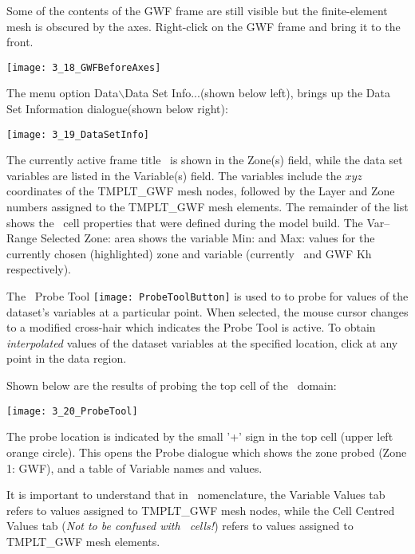 Some of the contents of the {\sf GWF} frame are still visible but the finite-element mesh is obscured by the axes.  Right-click on the {\sf GWF} frame and bring it to the front.

        \texttt{[image: 3\_18\_GWFBeforeAxes]}

  The menu option {\sf Data$\backslash$Data Set Info...}(shown below left), brings up the {\sf Data Set Information} dialogue(shown below right):

        \texttt{[image: 3\_19\_DataSetInfo]}

The currently active frame title \gwf\ is shown in the {\sf Zone(s)} field, while the data set variables are listed in the {\sf Variable(s)} field. The variables include the $xyz$ coordinates of the {\sf TMPLT\_GWF} mesh nodes, followed by the Layer and Zone numbers assigned to the {\sf TMPLT\_GWF} mesh elements.  The remainder of the list shows the \mfus\ cell properties that were defined during the model build. The {\sf Var--Range Selected Zone:} area shows the variable {\sf Min:} and {\sf Max:} values for the currently chosen (highlighted) zone and variable (currently \gwf\ and {\sf GWF Kh} respectively).   



 The \tecplot\ Probe Tool \texttt{[image: ProbeToolButton]} is used to to probe for values of the dataset's variables at a particular point. When selected, the mouse cursor changes to a modified cross-hair which indicates the Probe Tool is active. To obtain {\it interpolated} values of the dataset variables at the specified location, click at any point in the data region.

Shown below are the results of probing the top cell of the \gwf\ domain:

        \texttt{[image: 3\_20\_ProbeTool]}

The probe location is indicated by the small '+' sign in the top cell (upper left orange circle).  This opens the {\sf Probe} dialogue which shows the zone probed ({\sf Zone 1: GWF}), and a table of  Variable names and values.

It is important to understand that in \tecplot\ nomenclature, the {\sf Variable Values} tab refers to values assigned to {\sf TMPLT\_GWF} mesh nodes, while the {\sf Cell Centred Values} tab ({\em Not to be confused with \mf\ cells!}) refers to values assigned to {\sf TMPLT\_GWF} mesh elements.

